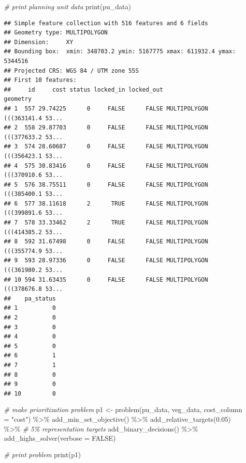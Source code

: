 \documentclass[
  12pt,
]{book}
\newenvironment{Shaded}{\begin{snugshade}}{\end{snugshade}}
\newcommand{\AttributeTok}[1]{\textcolor[rgb]{0.77,0.63,0.00}{#1}}
\newcommand{\CommentTok}[1]{\textcolor[rgb]{0.56,0.35,0.01}{\textit{#1}}}
\newcommand{\ConstantTok}[1]{\textcolor[rgb]{0.00,0.00,0.00}{#1}}
\newcommand{\FloatTok}[1]{\textcolor[rgb]{0.00,0.00,0.81}{#1}}
\newcommand{\FunctionTok}[1]{\textcolor[rgb]{0.00,0.00,0.00}{#1}}
\newcommand{\NormalTok}[1]{#1}
\newcommand{\OtherTok}[1]{\textcolor[rgb]{0.56,0.35,0.01}{#1}}
\newcommand{\SpecialCharTok}[1]{\textcolor[rgb]{0.00,0.00,0.00}{#1}}
\newcommand{\StringTok}[1]{\textcolor[rgb]{0.31,0.60,0.02}{#1}}
\begin{document}
\begin{Shaded}
\begin{Highlighting}[]
\CommentTok{\# print planning unit data}
\FunctionTok{print}\NormalTok{(pu\_data)}
\end{Highlighting}
\end{Shaded}

\begin{verbatim}
## Simple feature collection with 516 features and 6 fields
## Geometry type: MULTIPOLYGON
## Dimension:     XY
## Bounding box:  xmin: 348703.2 ymin: 5167775 xmax: 611932.4 ymax: 5344516
## Projected CRS: WGS 84 / UTM zone 55S
## First 10 features:
##     id     cost status locked_in locked_out                       geometry
## 1  557 29.74225      0     FALSE      FALSE MULTIPOLYGON (((363141.4 53...
## 2  558 29.87703      0     FALSE      FALSE MULTIPOLYGON (((377633.2 53...
## 3  574 28.60687      0     FALSE      FALSE MULTIPOLYGON (((356423.1 53...
## 4  575 30.83416      0     FALSE      FALSE MULTIPOLYGON (((370910.6 53...
## 5  576 38.75511      0     FALSE      FALSE MULTIPOLYGON (((385400.1 53...
## 6  577 38.11618      2      TRUE      FALSE MULTIPOLYGON (((399891.6 53...
## 7  578 33.33462      2      TRUE      FALSE MULTIPOLYGON (((414385.2 53...
## 8  592 31.67498      0     FALSE      FALSE MULTIPOLYGON (((355774.9 53...
## 9  593 28.97336      0     FALSE      FALSE MULTIPOLYGON (((361980.2 53...
## 10 594 31.63435      0     FALSE      FALSE MULTIPOLYGON (((378676.8 53...
##    pa_status
## 1          0
## 2          0
## 3          0
## 4          0
## 5          0
## 6          1
## 7          1
## 8          0
## 9          0
## 10         0
\end{verbatim}

\begin{Shaded}
\begin{Highlighting}[]
\CommentTok{\# make prioritization problem}
\NormalTok{p1 }\OtherTok{\textless{}{-}} \FunctionTok{problem}\NormalTok{(pu\_data, veg\_data, }\AttributeTok{cost\_column =} \StringTok{"cost"}\NormalTok{) }\SpecialCharTok{\%\textgreater{}\%}
      \FunctionTok{add\_min\_set\_objective}\NormalTok{() }\SpecialCharTok{\%\textgreater{}\%}
      \FunctionTok{add\_relative\_targets}\NormalTok{(}\FloatTok{0.05}\NormalTok{) }\SpecialCharTok{\%\textgreater{}\%} \CommentTok{\# 5\% representation targets}
      \FunctionTok{add\_binary\_decisions}\NormalTok{() }\SpecialCharTok{\%\textgreater{}\%}
      \FunctionTok{add\_highs\_solver}\NormalTok{(}\AttributeTok{verbose =} \ConstantTok{FALSE}\NormalTok{)}

\CommentTok{\# print problem}
\FunctionTok{print}\NormalTok{(p1)}
\end{Highlighting}
\end{Shaded}
\end{document}
